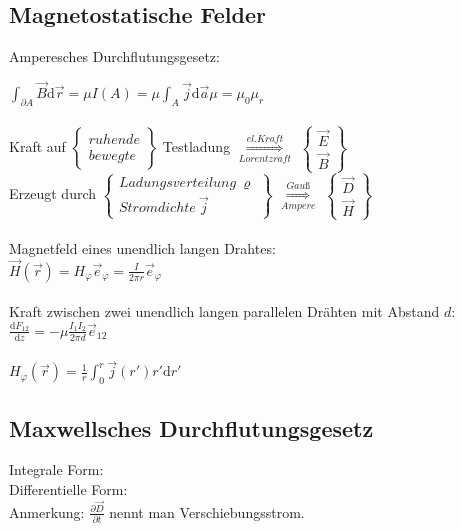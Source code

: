 \documentclass[10pt,a4paper]{scrartcl}
\begin{document}
\subsection{Magnetostatische Felder}
Amperesches Durchflutungsgesetz:\\
\begin{center} \end{center}
$\int_{\partial A} \vec B \mathrm d\vec r=\mu I(A)=\mu \int_{A} \vec j \mathrm d\vec a$\qquad $\mu=\mu_0\mu_r$\\
\\
Kraft auf $\begin{Bmatrix} ruhende \\ bewegte \end{Bmatrix}$ Testladung $\overset{el. Kraft}{\underset  {Lorentzraft}{\Longrightarrow}}$ $\begin{Bmatrix} \vec E \\ \vec B \end{Bmatrix}$ \\
Erzeugt durch $\begin{Bmatrix} Ladungsverteilung\ \varrho \\ Stromdichte\ \vec j \end{Bmatrix}$ $\overset{Gauß}{\underset {Ampere}{\Longrightarrow}}$ $\begin{Bmatrix} \vec D \\ \vec H \end{Bmatrix}$ \\
\\
Magnetfeld eines unendlich langen Drahtes:\\
$\vec H(\vec r)=H_\varphi \vec e_\varphi=\frac{I}{2\pi r} \vec e_\varphi$\\
\\
Kraft zwischen zwei unendlich langen parallelen Drähten mit Abstand $d$:
$\frac{\mathrm dF_{12}}{\mathrm dz}=-\mu \frac{I_1 I_2}{2\pi d} \vec e_{12}$\\
\\
$H_\varphi(\vec r)=\frac{1}{r}\int_0^r \vec j(r')r' \mathrm dr'$

\subsection{Maxwellsches Durchflutungsgesetz}
Integrale Form: \\
Differentielle Form: \\
Anmerkung: $\frac{\partial \vec D}{\partial t}$ nennt man Verschiebungsstrom.
\end{document}
